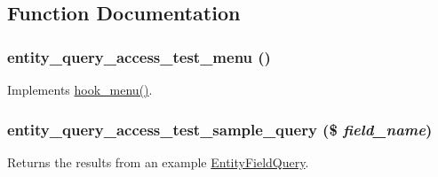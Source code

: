 \subsection{Function Documentation}
\hypertarget{entity__query__access__test_8module_af30f2c1b4e455c530c3f057bb49a6cd5}{
\subsubsection[{entity\_\-query\_\-access\_\-test\_\-menu}]{\setlength{\rightskip}{0pt plus 5cm}entity\_\-query\_\-access\_\-test\_\-menu ()}}
\label{entity__query__access__test_8module_af30f2c1b4e455c530c3f057bb49a6cd5}
Implements \hyperlink{group__hooks_ga5c95244fea59b25666e409759e133ded}{hook\_\-menu()}. \hypertarget{entity__query__access__test_8module_a6d912898f4447e168aaac37d8a64e14a}{
\subsubsection[{entity\_\-query\_\-access\_\-test\_\-sample\_\-query}]{\setlength{\rightskip}{0pt plus 5cm}entity\_\-query\_\-access\_\-test\_\-sample\_\-query (\$ {\em field\_\-name})}}
\label{entity__query__access__test_8module_a6d912898f4447e168aaac37d8a64e14a}
Returns the results from an example \hyperlink{classEntityFieldQuery}{EntityFieldQuery}. 